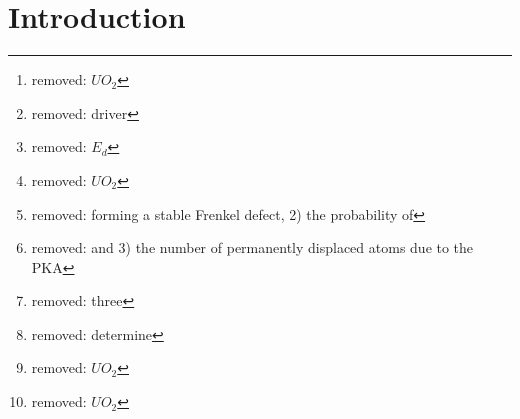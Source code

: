 \documentclass[review]{elsarticle} %
\providecommand{\DIFaddtex}[1]{{\protect\color{blue} \sf #1}} %
\providecommand{\DIFdeltex}[1]{{\protect\color{red} [..\footnote{removed: #1} ]}} %
\providecommand{\DIFaddbegin}{} %
\providecommand{\DIFaddend}{} %
\providecommand{\DIFdelbegin}{} %
\providecommand{\DIFdelend}{} %
\providecommand{\DIFadd}[1]{\texorpdfstring{\DIFaddtex{#1}}{#1}} %
\providecommand{\DIFdel}[1]{\texorpdfstring{\DIFdeltex{#1}}{}} %
\newcommand{\DIFscaledelfig}{0.5}
\newlength{\DIFdelgraphicswidth} %
\newlength{\DIFdelgraphicsheight} %
\newcommand{\DIFaddincludegraphics}[2][]{{\color{blue}\fbox{\DIFOincludegraphics[#1]{#2}}}} %
\newcommand{\DIFdelincludegraphics}[2][]{%
\sbox{\DIFdelgraphicsbox}{\DIFOincludegraphics[#1]{#2}}%
\settoboxwidth{\DIFdelgraphicswidth}{\DIFdelgraphicsbox} %
\settoboxtotalheight{\DIFdelgraphicsheight}{\DIFdelgraphicsbox} %
\scalebox{\DIFscaledelfig}{%
\parbox[b]{\DIFdelgraphicswidth}{\usebox{\DIFdelgraphicsbox}\\[-\baselineskip] \rule{\DIFdelgraphicswidth}{0em}}\llap{\resizebox{\DIFdelgraphicswidth}{\DIFdelgraphicsheight}{%
\setlength{\unitlength}{\DIFdelgraphicswidth}%
\begin{picture}(1,1)%
\thicklines\linethickness{2pt} %
{\color[rgb]{1,0,0}\put(0,0){\framebox(1,1){}}}%
{\color[rgb]{1,0,0}\put(0,0){\line( 1,1){1}}}%
{\color[rgb]{1,0,0}\put(0,1){\line(1,-1){1}}}%
\end{picture}%
}\hspace*{3pt}}} %
} %
\DeclareRobustCommand{\DIFaddbegin}{\DIFOaddbegin \let\includegraphics\DIFaddincludegraphics} %
\DeclareRobustCommand{\DIFaddend}{\DIFOaddend \let\includegraphics\DIFOincludegraphics} %
\DeclareRobustCommand{\DIFdelbegin}{\DIFOdelbegin \let\includegraphics\DIFdelincludegraphics} %
\DeclareRobustCommand{\DIFdelend}{\DIFOaddend \let\includegraphics\DIFOincludegraphics} %
\begin{document}
\begin{frontmatter}
  \DIFaddend \begin{abstract}
   Despite the extensive utilization of uranium dioxide (\DIFdelbegin \DIFdel{$UO_2$}\DIFdelend \DIFaddbegin \DIFadd{UO$_2$}\DIFaddend ) as a \DIFdelbegin \DIFdel{driver }\DIFdelend fuel in commercial nuclear reactors, there is only minimal information regarding the fundamental nature of radiation damage at high temperatures, such as those experienced by the fuel under operation. In this work, molecular dynamics simulations have been performed to determine the threshold displacement energy (\DIFdelbegin \DIFdel{$E_d$}\DIFdelend \DIFaddbegin \DIFadd{E$_d$}\DIFaddend ) for oxygen and uranium in \DIFdelbegin \DIFdel{$UO_2$ }\DIFdelend \DIFaddbegin \DIFadd{UO$_2$ }\DIFaddend at 1500 K. Three definitions of displacement energy were employed to fully study the nature of low energy radiation damage: 1) the probability of \DIFdelbegin \DIFdel{forming a stable Frenkel defect, 2) the probability of }\DIFdelend having the primary knock-on atom (PKA) leave its original lattice site, \DIFdelbegin \DIFdel{and 3) the number of permanently displaced atoms due to the PKA}\DIFdelend \DIFaddbegin \DIFadd{2) the probability that the PKA will permanently displace atoms from their original lattice site, and 3) the probability of forming a stable Frenkel pair}\DIFaddend . Additionally, \DIFdelbegin \DIFdel{three }\DIFdelend \DIFaddbegin \DIFadd{four }\DIFaddend unique interatomic potentials were utilized to \DIFdelbegin \DIFdel{determine }\DIFdelend \DIFaddbegin \DIFadd{investigate }\DIFaddend uncertainties associated with potential choice in high temperature radiation damage studies in \DIFdelbegin \DIFdel{$UO_2$}\DIFdelend \DIFaddbegin \DIFadd{UO$_2$}\DIFaddend . This work provides critical insight into the high temperature behavior of radiation damage in \DIFdelbegin \DIFdel{$UO_2$}\DIFdelend \DIFaddbegin \DIFadd{UO$_2$}\DIFaddend , as well as the variation in behavior between oxygen and uranium PKAs.
  \end{abstract}
\DIFdelbegin %
\DIFdelend 


\DIFaddbegin \end{frontmatter}

\DIFaddend \clearpage
\newpage

\section{Introduction}
\end{document}
